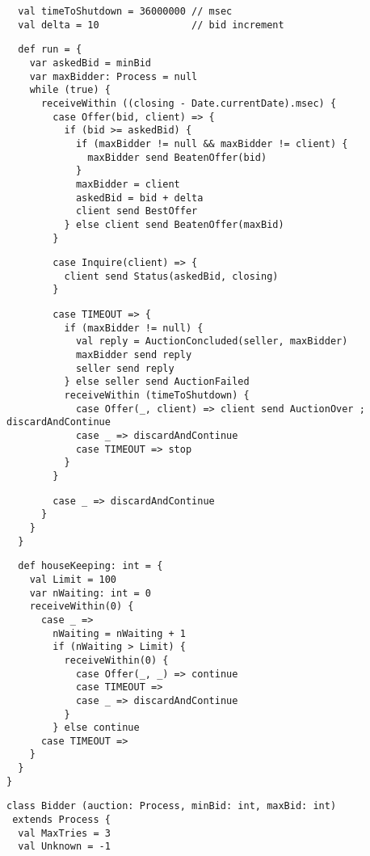 {{\begin{lstlisting}
  val timeToShutdown = 36000000 // msec
  val delta = 10                // bid increment
\end{lstlisting}
\begin{lstlisting}
  def run = {
    var askedBid = minBid
    var maxBidder: Process = null
    while (true) {
      receiveWithin ((closing - Date.currentDate).msec) {
        case Offer(bid, client) => {
          if (bid >= askedBid) {
            if (maxBidder != null && maxBidder != client) {
              maxBidder send BeatenOffer(bid)
            }
            maxBidder = client
            askedBid = bid + delta
            client send BestOffer
          } else client send BeatenOffer(maxBid)
        }
\end{lstlisting}
\begin{lstlisting}
        case Inquire(client) => {
          client send Status(askedBid, closing)
        }
\end{lstlisting}
\begin{lstlisting}
        case TIMEOUT => {
          if (maxBidder != null) {
            val reply = AuctionConcluded(seller, maxBidder)
            maxBidder send reply
            seller send reply
          } else seller send AuctionFailed
          receiveWithin (timeToShutdown) {
            case Offer(_, client) => client send AuctionOver ; discardAndContinue
            case _ => discardAndContinue
            case TIMEOUT => stop
          }
        }
\end{lstlisting}
\begin{lstlisting}
        case _ => discardAndContinue
      }
    }
  }
\end{lstlisting}
\begin{lstlisting}
  def houseKeeping: int = {
    val Limit = 100
    var nWaiting: int = 0
    receiveWithin(0) {
      case _ =>
        nWaiting = nWaiting + 1
        if (nWaiting > Limit) {
          receiveWithin(0) {
            case Offer(_, _) => continue
            case TIMEOUT =>
            case _ => discardAndContinue
          }
        } else continue
      case TIMEOUT =>
    }
  }
}
\end{lstlisting}
\begin{lstlisting}
class Bidder (auction: Process, minBid: int, maxBid: int)
 extends Process {
  val MaxTries = 3
  val Unknown = -1


\end{lstlisting}}}
